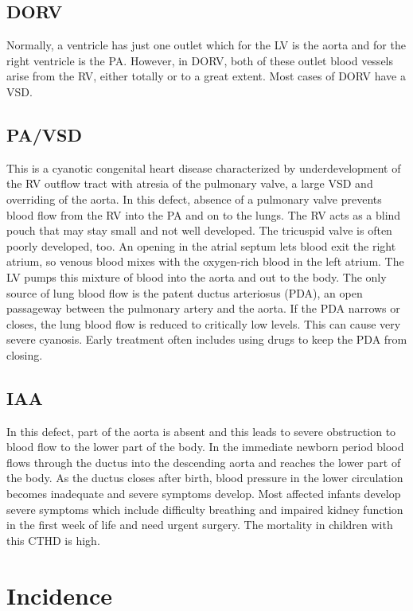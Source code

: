 \begin{refsection}
\subsection{DORV} Normally, a ventricle has just one outlet which for the LV is the aorta and for the right ventricle is the PA. However, in DORV, both of these outlet blood vessels arise from the RV, either totally or to a great extent. Most cases of DORV have a VSD.

\subsection{PA/VSD} This is a cyanotic congenital heart disease characterized by underdevelopment of the RV outflow tract with atresia of the pulmonary valve, a large VSD and overriding of the aorta. In this defect, absence of a pulmonary valve prevents blood flow from the RV into the PA and on to the lungs. The RV acts as a blind pouch that may stay small and not well developed. The tricuspid valve is often poorly developed, too. An opening in the atrial septum lets blood exit the right atrium, so venous blood mixes with the oxygen-rich blood in the left atrium. The LV pumps this mixture of blood into the aorta and out to the body. The only source of lung blood flow is the patent ductus arteriosus (PDA), an open passageway between the pulmonary artery and the aorta. If the PDA narrows or closes, the lung blood flow is reduced to critically low levels. This can cause very severe cyanosis. Early treatment often includes using drugs to keep the PDA from closing.

\subsection{IAA} In this defect, part of the aorta is absent and this leads to severe obstruction to blood flow to the lower part of the body. In the immediate newborn period blood flows through the ductus into the descending aorta and reaches the lower part of the body. As the ductus closes after birth, blood pressure in the lower circulation becomes inadequate and severe symptoms develop. Most affected infants develop severe symptoms which include difficulty breathing and impaired kidney function in the first week of life and need urgent surgery. The mortality in children with this CTHD is high.

\section{Incidence}


\end{refsection}
